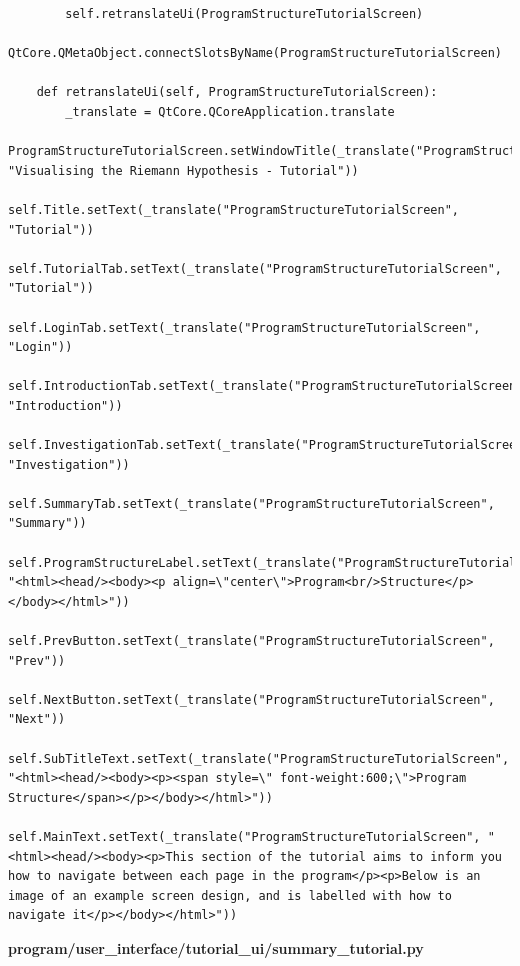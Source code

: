 \documentclass{article}
\begin{document}
\begin{lstlisting}
        self.retranslateUi(ProgramStructureTutorialScreen)
        QtCore.QMetaObject.connectSlotsByName(ProgramStructureTutorialScreen)

    def retranslateUi(self, ProgramStructureTutorialScreen):
        _translate = QtCore.QCoreApplication.translate
        ProgramStructureTutorialScreen.setWindowTitle(_translate("ProgramStructureTutorialScreen", "Visualising the Riemann Hypothesis - Tutorial"))
        self.Title.setText(_translate("ProgramStructureTutorialScreen", "Tutorial"))
        self.TutorialTab.setText(_translate("ProgramStructureTutorialScreen", "Tutorial"))
        self.LoginTab.setText(_translate("ProgramStructureTutorialScreen", "Login"))
        self.IntroductionTab.setText(_translate("ProgramStructureTutorialScreen", "Introduction"))
        self.InvestigationTab.setText(_translate("ProgramStructureTutorialScreen", "Investigation"))
        self.SummaryTab.setText(_translate("ProgramStructureTutorialScreen", "Summary"))
        self.ProgramStructureLabel.setText(_translate("ProgramStructureTutorialScreen", "<html><head/><body><p align=\"center\">Program<br/>Structure</p></body></html>"))
        self.PrevButton.setText(_translate("ProgramStructureTutorialScreen", "Prev"))
        self.NextButton.setText(_translate("ProgramStructureTutorialScreen", "Next"))
        self.SubTitleText.setText(_translate("ProgramStructureTutorialScreen", "<html><head/><body><p><span style=\" font-weight:600;\">Program Structure</span></p></body></html>"))
        self.MainText.setText(_translate("ProgramStructureTutorialScreen", "<html><head/><body><p>This section of the tutorial aims to inform you how to navigate between each page in the program</p><p>Below is an image of an example screen design, and is labelled with how to navigate it</p></body></html>"))
\end{lstlisting}

\textbf{program/user\_interface/tutorial\_ui/summary\_tutorial.py}
\end{document}
